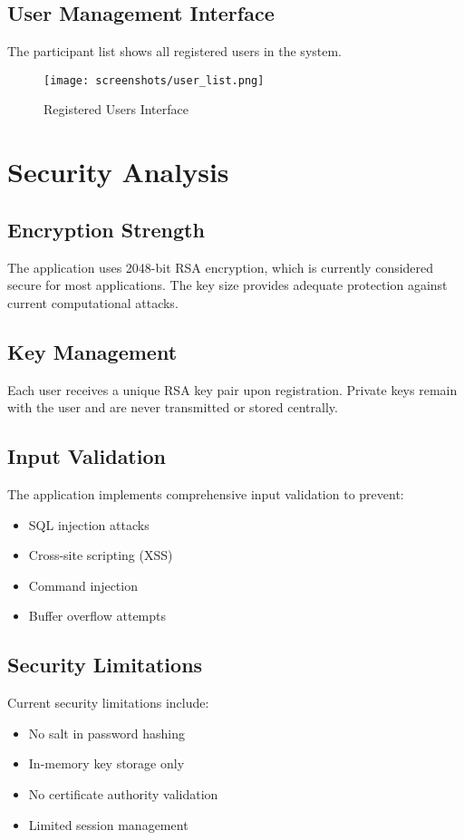 \documentclass[12pt,a4paper]{article}
\begin{document}
\subsection{User Management Interface}
The participant list shows all registered users in the system.

\begin{figure}[H]
    \centering
    \texttt{[image: screenshots/user\_list.png]}
    \caption{Registered Users Interface}
    \label{fig:users}
\end{figure}

\section{Security Analysis}

\subsection{Encryption Strength}
The application uses 2048-bit RSA encryption, which is currently considered secure for most applications. The key size provides adequate protection against current computational attacks.

\subsection{Key Management}
Each user receives a unique RSA key pair upon registration. Private keys remain with the user and are never transmitted or stored centrally.

\subsection{Input Validation}
The application implements comprehensive input validation to prevent:
\begin{itemize}
    \item SQL injection attacks
    \item Cross-site scripting (XSS)
    \item Command injection
    \item Buffer overflow attempts
\end{itemize}

\subsection{Security Limitations}
Current security limitations include:
\begin{itemize}
    \item No salt in password hashing
    \item In-memory key storage only
    \item No certificate authority validation
    \item Limited session management
\end{itemize}
\end{document}
